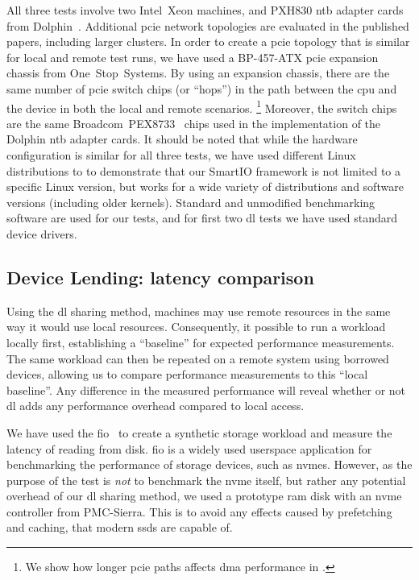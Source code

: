 All three tests involve two Intel~Xeon machines, and PXH830 \gls{ntb} adapter cards from Dolphin~\cite{pxh830}.
%
Additional \gls{pcie} network topologies are evaluated in the published papers, including larger clusters.
%
In order to create a \gls{pcie} topology that is similar for local and remote test runs, we have used a BP-457-ATX \gls{pcie} expansion chassis from One~Stop~Systems.
%
By using an expansion chassis, there are the same number of \gls{pcie} switch chips (or ``hops'') in the path between the \gls{cpu} and the device in both the local and remote scenarios.%
\footnote{We show how longer \gls{pcie} paths affects \gls{dma} performance in .}
%
Moreover, the switch chips are the same  Broadcom~PEX8733~\cite{pex8733} chips used in the implementation of the Dolphin \gls{ntb} adapter cards.
%
It should be noted that while the hardware configuration is similar for all three tests, we have used different Linux distributions to to demonstrate that our SmartIO framework is not limited to a specific Linux version, but works for a wide variety of distributions and software versions (including older kernels).
%
Standard and unmodified benchmarking software are used for our tests, and for first two \gls{dl} tests we have used standard device drivers.



\subsection{Device Lending: latency comparison}
%
Using the \gls{dl} sharing method, machines may use remote resources in the same way it would use local resources.
%
Consequently, it possible to run a workload locally first, establishing a ``baseline'' for expected performance measurements.
%
The same workload can then be repeated on a remote system using borrowed devices, allowing us to compare performance measurements to this ``local baseline''.
%
Any difference in the measured performance will reveal whether or not \gls{dl} adds any performance overhead compared to local access.



We have used the \gls{fio}~\cite{url:fio} to create a synthetic storage workload and measure the latency of reading from disk.
%
\Gls{fio} is a widely used \gls{userspace} application for benchmarking the performance of storage devices, such as \glspl{nvme}.
%
However, as the purpose of the test is \emph{not} to benchmark the \gls{nvme} itself, but rather any potential overhead of our \gls{dl} sharing method, we used a prototype \gls{ram} disk with an \gls{nvme} controller from PMC-Sierra.
%
This is to avoid any effects caused by prefetching and caching, that modern \glspl{ssd} are capable of.



